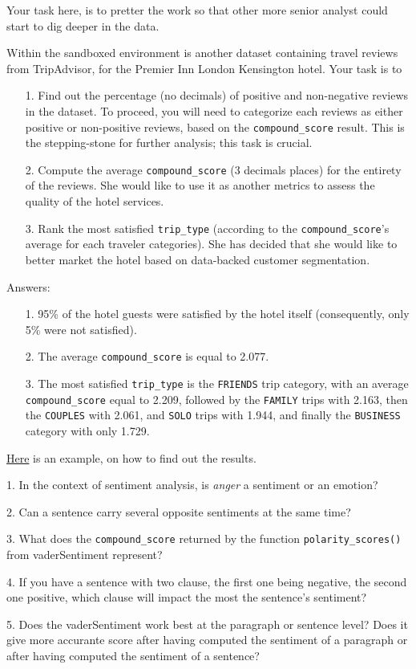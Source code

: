 	Your task here, is to pretter the work so that other more senior analyst could start to dig deeper in the data. 
	
	Within the sandboxed environment is another dataset containing travel reviews from TripAdvisor, for the Premier Inn London Kensington hotel. Your task is to
	\begin{itemize}
		\item [1.] Find out the percentage (no decimals) of positive and non-negative reviews in the dataset. To proceed, you will need to categorize each reviews as either positive or non-positive reviews, based on the \verb|compound_score| result. This is the stepping-stone for further analysis; this task is crucial.
		\item [2.] Compute the average \verb|compound_score| (3 decimals places) for the entirety of the reviews. She would like to use it as another metrics to assess the quality of the hotel services. 
		\item [3.] Rank the most satisfied \verb|trip_type| (according to the \verb|compound_score|'s average for each traveler categories). She has decided that she would like to better market the hotel based on data-backed customer segmentation.
	\end{itemize}
	
	Answers:
	\begin{itemize}
		\item [1.] 95\% of the hotel guests were satisfied by the hotel itself (consequently, only 5\% were not satisfied).
		\item [2.] The average \verb|compound_score| is equal to 2.077.
		\item [3.] The most satisfied \verb|trip_type| is the \verb|FRIENDS| trip category, with an average \verb|compound_score| equal to 2.209, followed by the \verb|FAMILY| trips with 2.163, then the \verb|COUPLES| with 2.061, and \verb|SOLO| trips with 1.944, and finally the \verb|BUSINESS| category with only 1.729.
	\end{itemize}
	\href{https://gist.github.com/ryanzidago/ef8093cb553913026b0cd3348cf07c7c}{Here} is an example, on how to find out the results.
	
	\begin{testquestion}
		\item [1.] In the context of sentiment analysis, is \textit{anger} a sentiment or an emotion?
		\item [2.] Can a sentence carry several opposite sentiments at the same time?
		\item [3.] What does the \verb|compound_score| returned by the function \verb|polarity_scores()| from vaderSentiment represent?
		\item [4.] If you have a sentence with two clause, the first one being negative, the second one positive, which clause will impact the most the sentence's sentiment?
		\item [5.] Does the vaderSentiment work best at the paragraph or sentence level? Does it give more accurante score after having computed the sentiment of a paragraph or after having computed the sentiment of a sentence?
	\end{testquestion}


